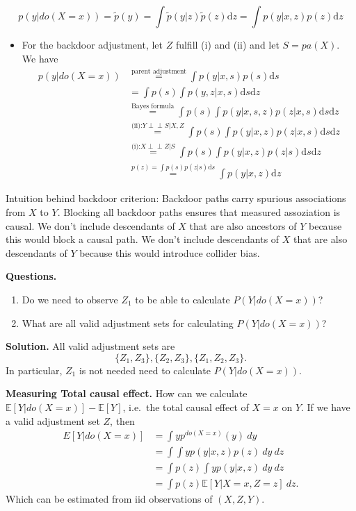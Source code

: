 \documentclass[a4paper,10pt,openany]{book}
\providecommand{\tightlist}{%
 \setlength{\itemsep}{0pt}\setlength{\parskip}{0pt}}
\begin{document}
\[
p(y|do(X=x))= \tilde p(y)= \int \tilde p(y|z) \tilde p(z) \mathrm dz = \int  p(y|x,z)  p(z) \mathrm dz
\]

\begin{itemize}
\tightlist
\item
  For the backdoor adjustment, let \(Z\) fulfill (i) and (ii) and let \(S=pa(X)\). We have
  \begin{align}
  p(y|do(X=x))&\stackrel{\text{parent adjustment}}{=} \int  p(y|x,s)  p(s) \mathrm ds\\
  &=\int p(s)\int   p(y,z|x,s) \mathrm ds \mathrm dz \\
  &\stackrel{\text{Bayes formula}}{=}\int p(s)\int   p(y|x,s,z) p(z|x,s) \mathrm ds \mathrm dz \\
  &\stackrel{\text{(ii):} Y {\perp\!\!\!\!\perp } {S}| {X,Z}}{=}\int p(s)\int   p(y|x,z) p(z|x,s) \mathrm ds \mathrm dz \\
  &\stackrel{\text{(i):} X {\perp\!\!\!\!\perp } {Z}| {S}}{=}\int p(s)\int   p(y|x,z) p(z|s) \mathrm ds \mathrm dz \\
  &\stackrel{p(z)= \int p(s)p(z|s) \mathrm ds}{=}\int   p(y|x,z)   \mathrm dz 
  \end{align}
\end{itemize}

Intuition behind backdoor criterion: Backdoor paths carry spurious associations from \(X\) to \(Y\). Blocking all backdoor paths ensures that measured assoziation is causal. We don't include descendants of \(𝑋\) that are also ancestors of \(𝑌\) because this would block a causal path. We don't include descendants of \(𝑋\) that are also descendants of \(𝑌\) because this would introduce collider bias.

\textbf{Questions.}

\begin{enumerate}
\def\labelenumi{\alph{enumi}.}
\tightlist
\item
  Do we need to observe \(Z_1\) to be able to calculate \(P(Y|do(X=x))\)?
\item
  What are all valid adjustment sets for calculating \(P(Y|do(X=x))\)?
\end{enumerate}

\textbf{Solution.} All valid adjustment sets are
\[
\{Z_1,Z_3\},\{Z_2,Z_3\},\{Z_1,Z_2,Z_3\}.
\]
In particular, \(Z_1\) is not needed need to calculate \(P(Y\vert do(X=x))\).

\textbf{Measuring Total causal effect.} How can we calculate \(\mathbb E[Y\vert do(X =x)]-\mathbb E[Y]\), i.e.~the total causal effect of \(X=x\) on \(Y\). If we have a valid adjustment set \(Z\), then
\begin{align}
E[Y\vert do(X =x)]&= \int y p^{d o(X=x)}(y) \ dy \\
&= \int \int  y p(y\vert x,z)p(z) \ dy \ dz \\
&= \int p(z)   \int y p(y\vert x,z)\ dy \ dz \\
&= \int p(z)  \mathbb E[  Y\vert X=x,Z=z]\ dz .
\end{align}
Which can be estimated from iid observations of \((X,Z,Y)\).
\end{document}
